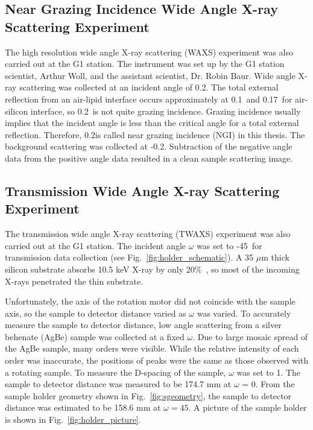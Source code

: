 \subsection{Near Grazing Incidence Wide Angle X-ray Scattering Experiment}
\label{nGIWAXS_method}
The high resolution wide angle X-ray scattering (WAXS)
experiment was also carried out at the G1 station. 
The instrument was set up by the G1
station scientist, Arthur Woll, and the assistant scientist, Dr. Robin Baur.
Wide angle X-ray scattering was collected at an incident angle of 0.2\textdegree. 
The total external reflection from an air-lipid interface occurs approximately 
at 0.1\textdegree\ and 0.17\textdegree\ for air-silicon interface, 
so 0.2\textdegree\ is not quite grazing incidence.
Grazing incidence usually implies that the incident angle is less than the 
critical angle for a total external reflection.
Therefore, 0.2\textdegree is called near grazing incidence (NGI) in this thesis.
The background scattering was collected at -0.2\textdegree. Subtraction
of the negative angle data from the positive angle data resulted in 
a clean sample scattering image.


\subsection{Transmission Wide Angle X-ray Scattering Experiment}
\label{TWAXS_method}
The transmission wide angle X-ray scattering (TWAXS) experiment was also 
carried out at the G1 station.
The incident angle $\omega$ was set to -45\textdegree\ for transmission data
collection (see Fig.~\ref{fig:holder_schematic}). 
A 35 $\mu$m thick silicon substrate absorbs 10.5 keV X-ray 
by only 20\%\ \cite{ref:cxro}, so most of the incoming X-rays penetrated
the thin substrate. 
 
Unfortunately,
the axis of the rotation motor did not coincide with the sample axis, so
the sample to detector distance varied as $\omega$ was varied. To accurately
measure the sample to detector distance, low angle scattering from a 
silver behenate (AgBe) sample was collected
at a fixed $\omega$. Due to large mosaic spread of the AgBe sample, many orders were
visible. While the relative intensity of each order was inaccurate, 
the positions of peaks were the same as those observed with a rotating sample.
To measure the D-spacing of the sample, $\omega$ was set to 1\textdegree.
The sample to detector distance was measured to be 174.7 mm 
at $\omega$ = 0\textdegree.
From the sample holder geometry shown in Fig.~\ref{fig:sgeometry},
the sample to detector distance was estimated to be 
158.6 mm at $\omega=45$\textdegree.
A picture of the sample holder is shown in Fig.~\ref{fig:holder_picture}.

